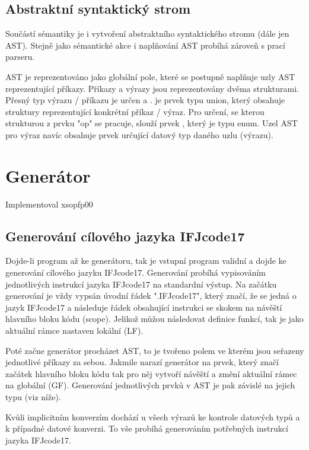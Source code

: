 \documentclass[11pt,a4paper]{article}
\begin{document}
    \subsection{Abstraktní syntaktický strom}
    Součástí sémantiky je i vytvoření abstraktního syntaktického stromu (dále jen AST). Stejně jako sémantické akce i naplňování AST probíhá zároveň s prací parseru.

    AST je reprezentováno jako globální pole, které se postupně naplňuje uzly AST reprezentující příkazy. Příkazy a výrazy jsou reprezentovány dvěma strukturami. Přesný typ výrazu / příkazu je určen  a .  je prvek typu union, který obsahuje struktury reprezentující konkrétní příkaz / výraz. Pro určení, se kterou strukturou z prvku "op" se pracuje, slouží prvek , který je typu enum. Uzel AST pro výraz navíc obsahuje prvek  určující datový typ daného uzlu (výrazu). \cite{AST:AST_in_C}

	\newpage


\section{Generátor}
    Implementoval xsopfp00

    \subsection{Generování cílového jazyka IFJcode17}
    Dojde-li program až ke generátoru, tak je vstupní program validní a dojde ke generování cílového jazyku IFJcode17. Generování probíhá vypisováním jednotlivých instrukcí jazyka IFJcode17 na standardní výstup. Na začátku generování je vždy vypsán úvodní řádek ".IFJcode17", který značí, že se jedná o jazyk IFJcode17 a následuje řádek obsahující instrukci se skokem na návěští hlavního bloku kódu (scope). Jelikož můžou následovat definice funkcí, tak je jako aktuální rámce nastaven lokální (LF).


    Poté začne generátor procházet AST, to je tvořeno polem ve kterém jsou seřazeny jednotlivé příkazy za sebou. Jakmile narazí generátor na prvek, který značí začátek hlavního bloku kódu tak pro něj vytvoří návěští a změní aktuální rámec na globální (GF). Generování jednotlivých prvků v AST je pak závislé na jejich typu (viz níže).

    Kvůli implicitním konverzím dochází u všech výrazů ke kontrole datových typů a k případné datové konverzi. To vše probíhá generováním potřebných instrukcí jazyka IFJcode17.
\end{document}
